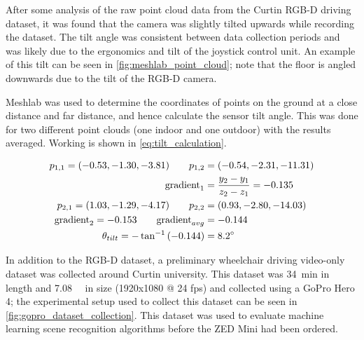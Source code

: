 After some analysis of the raw point cloud data from the Curtin RGB-D driving dataset,
it was found that the camera was slightly tilted upwards while recording the dataset.
The tilt angle was consistent between data collection periods
and was likely due to the ergonomics and tilt of the joystick control unit.
An example of this tilt can be seen in \cref{fig:meshlab_point_cloud}; note
that the floor is angled downwards due to the tilt of the RGB-D camera.

Meshlab was used to determine the coordinates of points
on the ground at a close distance and far distance, and hence calculate the
sensor tilt angle.
This was done for two different point clouds (one indoor and one outdoor)
with the results averaged. Working is shown in \cref{eq:tilt_calculation}.

\begin{equation}
\begin{split}
p_{1,1} = (-0.53, -1.30, -3.81) \qquad p_{1,2} &= (-0.54, -2.31, -11.31)\\
\textrm{gradient}_1 &= \frac{y_2 - y_1}{z_2 - z_1} = -0.135\\
p_{2,1} = (1.03, -1.29, -4.17) \qquad p_{2,2} &= (0.93, -2.80, -14.03)\\
\textrm{gradient}_2 = -0.153 \qquad \textrm{gradient}_{avg} &= -0.144\\
\theta_{tilt} = -\tan^{-1}\left(-0.144\right) &= 8.2\degree
\end{split}
\label{eq:tilt_calculation}
\end{equation}

In addition to the RGB-D dataset, a preliminary wheelchair driving video-only dataset was collected around
Curtin university.
This dataset was \SI{34}{\minute} in length and \SI{7.08}{\giga\byte} in size (1920x1080 @ 24 fps)
and collected using a GoPro Hero 4; the experimental setup used to collect this
dataset can be seen in \cref{fig:gopro_dataset_collection}.
This dataset was used to evaluate machine learning scene recognition algorithms
before the ZED Mini had been ordered.

